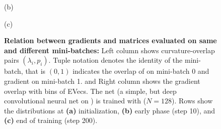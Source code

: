 \begin{figure}[!b]
  \vspace{-2.5\baselineskip}

  \begin{flushleft}
    \vspace{1ex}
    (b)
  \end{flushleft}
  \vspace{-2\baselineskip}

  \hfill
  \begin{minipage}[t]{0.495\linewidth}
    \centering
    
  \end{minipage}
  \begin{minipage}[t]{0.495\linewidth}
    \centering
    
  \end{minipage}
  \hfill

  \vspace{-2.5\baselineskip}

  \begin{flushleft}
    \vspace{1ex}
    (c)
  \end{flushleft}
  \vspace{-2\baselineskip}

  \hfill
  \begin{minipage}[t]{0.495\linewidth}
    \centering
    
  \end{minipage}
  \begin{minipage}[t]{0.495\linewidth}
    \centering
    
  \end{minipage}
  \hfill
  \vspace{-2\baselineskip}

  \caption{\textbf{Relation between gradients and \ggn matrices evaluated on
      same and different mini-batches:} Left column shows curvature-overlap
    pairs $(\lambda_i, p_i)$. Tuple notation denotes the identity of the
    mini-batch, that is $(0,1)$ indicates the overlap of \ggn on mini-batch 0
    and gradient on mini-batch 1. and Right column shows the gradient overlap
    with bins of EVecs. The net (a simple, but deep convolutional neural net on
    \mnist) is trained with \sgd ($N=128$). Rows show the distributions at
    \textbf{(a)} initialization, \textbf{(b)} early phase (step 10), and
    \textbf{(c)} end of training (step 200).}
  \label{fig:gradient-curvature-overlap-batches-0-1}
\end{figure}

